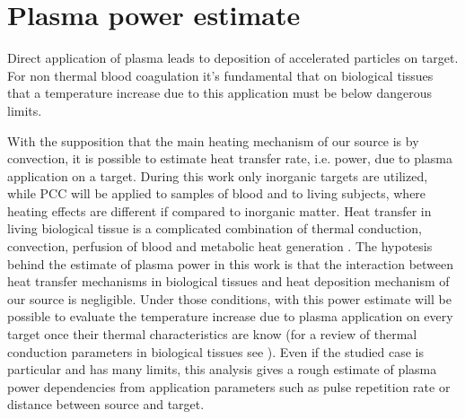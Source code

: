 \chapter{Plasma power estimate}
\label{ch:temperature}
Direct application of plasma leads to deposition of accelerated particles on target. For non thermal blood coagulation it's fundamental that on biological tissues that a temperature increase due to this application must be below dangerous limits.

With the supposition that the main heating mechanism of our source is by convection, it is possible to estimate heat transfer rate, i.e. power, due to plasma application on a target. During this work only inorganic targets are utilized, while PCC will be applied to samples of blood and to living subjects, where heating effects are different if compared to inorganic matter. Heat transfer in living biological tissue is a complicated combination of thermal conduction, convection, perfusion of blood and metabolic heat generation \cite{ShitTemp}. The hypotesis behind the estimate of plasma power in this work is that the interaction between heat transfer mechanisms in biological tissues and heat deposition mechanism of our source is negligible. Under those conditions, with this power estimate will be possible to evaluate the temperature increase due to plasma application on every target once their thermal characteristics are know (for a review of thermal conduction parameters in biological tissues see \cite{biotissues}).
Even if the studied case is particular and has many limits, this analysis gives a rough estimate of plasma power dependencies from application parameters such as pulse repetition rate or distance between source and target.


